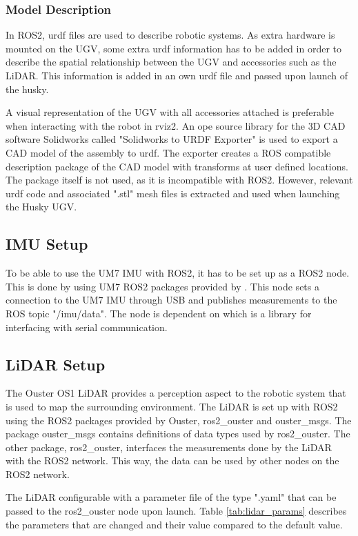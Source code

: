 \subsubsection{Model Description} \label{sec:M:CS:UGV:S:ModelDescription}
In ROS2, urdf files are used to describe robotic systems. As extra hardware is mounted on the UGV, some extra urdf information has to be added in order to describe the spatial relationship between the UGV and accessories such as the LiDAR. This information is added in an own urdf file and passed upon launch of the husky.

A visual representation of the UGV with all accessories attached is preferable when interacting with the robot in rviz2. An ope source library for the 3D CAD software Solidworks called "Solidworks to URDF Exporter" \cite{urdf_exporter} is used to export a CAD model of the assembly to urdf. The exporter creates a ROS compatible description package of the CAD model with transforms at user defined locations. The package itself is not used, as it is incompatible with ROS2. However, relevant urdf code and associated ".stl" mesh files is extracted and used when launching the Husky UGV.

\subsection{IMU Setup}
To be able to use the UM7 IMU with ROS2, it has to be set up as a ROS2 node. This is done by using UM7 ROS2 packages provided by \cite{um7_repo}. This node sets a connection to the UM7 IMU through USB and publishes measurements to the ROS topic "/imu/data". The node is dependent on \cite{serial_repo} which is a library for interfacing with serial communication.

\subsection{LiDAR Setup} \label{sec:M:MRC:LiDARSetup}
The Ouster OS1 LiDAR provides a perception aspect to the robotic system that is used to map the surrounding environment. The LiDAR is set up with ROS2 using the ROS2 packages provided by Ouster\cite{ouster_repo}, ros2\_ouster and ouster\_msgs. The package ouster\_msgs contains definitions of data types used by ros2\_ouster. The other package, ros2\_ouster, interfaces the measurements done by the LiDAR with the ROS2 network. This way, the data can be used by other nodes on the ROS2 network.

The LiDAR configurable with a parameter file of the type ".yaml" that can be passed to the ros2\_ouster node upon launch. Table \ref{tab:lidar_params} describes the parameters that are changed and their value compared to the default value.

